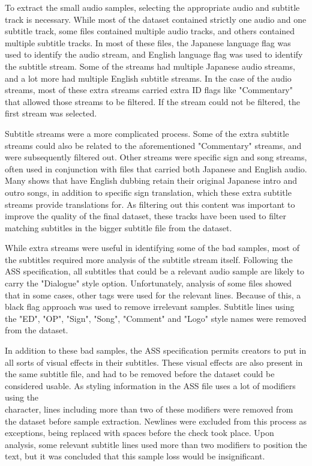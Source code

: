 To extract the small audio samples, selecting the appropriate audio and subtitle track is necessary.
While most of the dataset contained strictly one audio and one subtitle track, some files contained multiple audio tracks, and others contained multiple subtitle tracks.
In most of these files, the Japanese language flag was used to identify the audio stream, and English language flag was used to identify the subtitle stream.
Some of the streams had multiple Japanese audio streams, and a lot more had multiple English subtitle streams.
In the case of the audio streams, most of these extra streams carried extra ID flags like "Commentary" that allowed those streams to be filtered.
If the stream could not be filtered, the first stream was selected.

Subtitle streams were a more complicated process.
Some of the extra subtitle streams could also be related to the aforementioned "Commentary" streams, and were subsequently filtered out.
Other streams were specific sign and song streams, often used in conjunction with files that carried both Japanese and English audio.
Many shows that have English dubbing retain their original Japanese intro and outro songs, in addition to specific sign translation, which these extra subtitle streams provide translations for.
As filtering out this content was important to improve the quality of the final dataset, these tracks have been used to filter matching subtitles in the bigger subtitle file from the dataset.


While extra streams were useful in identifying some of the bad samples, most of the subtitles required more analysis of the subtitle stream itself.
Following the ASS specification, all subtitles that could be a relevant audio sample are likely to carry the "Dialogue" style option.
Unfortunately, analysis of some files showed that in some cases, other tags were used for the relevant lines.
Because of this, a black flag approach was used to remove irrelevant samples.
Subtitle lines using the "ED", "OP", "Sign", "Song", "Comment" and "Logo" style names were removed from the dataset.

In addition to these bad samples, the ASS specification permits creators to put in all sorts of visual effects in their subtitles. 
These visual effects are also present in the same subtitle file, and had to be removed before the dataset could be considered usable.
As styling information in the ASS file uses a lot of modifiers using the \\ character, lines including more than two of these modifiers were removed from the dataset before sample extraction.
Newlines were excluded from this process as exceptions, being replaced with spaces before the check took place.
Upon analysis, some relevant subtitle lines used more than two modifiers to position the text, but it was concluded that this sample loss would be insignificant.

